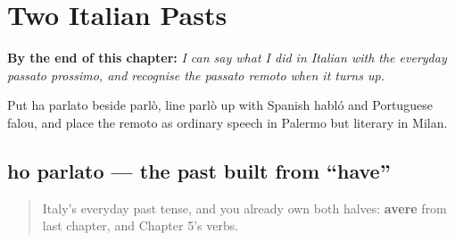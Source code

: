 
\chapter{Two Italian Pasts}
\label{ch:it-two-pasts}

\begin{chapteropening}
\textbf{By the end of this chapter:} \emph{I can say what I did in Italian with the everyday passato prossimo, and recognise the passato remoto when it turns up.}

Put ha parlato beside parlò, line parlò up with Spanish habló and Portuguese falou, and place the remoto as ordinary speech in Palermo but literary in Milan.
\end{chapteropening}

\section[ho parlato]{ho parlato — the past built from \textquotedblleft{}have\textquotedblright{}}

\label{lesson:IT-C15-passato-prossimo}



\begin{quote}
Italy's everyday past tense, and you already own both halves: \textbf{avere} from last chapter, and Chapter 5's verbs.
\end{quote}

